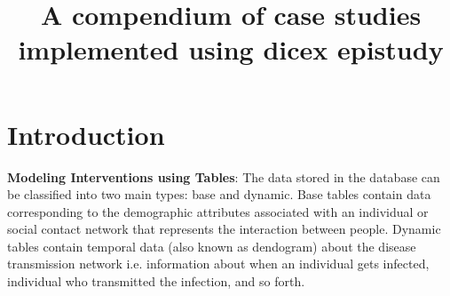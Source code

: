 \documentclass{book}
\begin{document}
\title{A compendium of case studies implemented using dicex epistudy} 

\maketitle
\tableofcontents

\chapter{Introduction}
\textbf{Modeling Interventions using Tables}: The data stored in the database can be classified into two main types: base and dynamic.
Base tables contain data corresponding to the demographic attributes associated with an individual or social contact network that represents 
the interaction between people. Dynamic tables contain temporal data (also known as dendogram) about the disease transmission network i.e. information about 
when an individual gets infected, individual who transmitted the infection, and so forth.  \\
\end{document}
